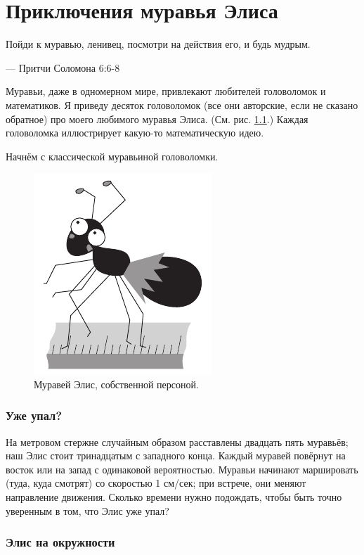 \chapter{Приключения муравья Элиса}


\setlength{\epigraphwidth}{.67\textwidth}
\epigraph{Пойди к муравью, ленивец, посмотри на действия его, и будь мудрым.
}{--- Притчи Соломона 6:6-8} 

Муравьи, даже в одномерном мире, привлекают любителей головоломок и математиков.
Я приведу десяток головоломок (все они авторские, если не сказано обратное) про моего любимого муравья Элиса.
(См. рис. \ref{pic:alice1}.)
Каждая головоломка иллюстрирует какую-то математическую идею.

Начнём с классической муравьиной головоломки.

\begin{figure}[ht!]
\centering
\includegraphics[scale=.5]{pics/alice1}
\caption{Муравей Элис, собственной персоной.}
\label{pic:alice1}
\end{figure}

\subsection*{Уже упал?}\label{Уже упал?}

На метровом стержне случайным образом расставлены двадцать пять муравьёв; наш Элис стоит тринадцатым с западного конца.
Каждый муравей повёрнут на восток или на запад с одинаковой вероятностью.
Муравьи начинают маршировать (туда, куда смотрят) со скоростью 1 см/сек;
при встрече, они меняют направление движения.
Сколько времени нужно подождать, чтобы быть точно уверенным в том, что Элис уже упал?

\subsection*{Элис на окружности}

